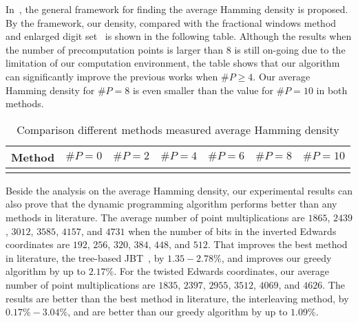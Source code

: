 In~\cite{analysisMethod}, the general framework for finding the average Hamming density is proposed. By the framework, our density, compared with the fractional windows method~\cite{fractional} and enlarged digit set~\cite{enlarged4} is shown in the following table. Although the results when the number of precomputation points is larger than $8$ is still on-going due to the limitation of our computation environment, the table shows that our algorithm can significantly improve the previous works when $\#P \geq 4$. Our average Hamming density for $\#P = 8$ is even smaller than the value for $\#P = 10$ in both methods.

\begin{table}[h]
\centering
\begin{tabular}{|L{0.2\textwidth}|*6{C{0.12\textwidth}|} }
\toprule
Method
	&$\#P = 0$
		&$\#P = 2$
			&$\#P = 4$
				&$\#P = 6$
					&$\#P = 8$
						&$\#P = 10$\\
\midrule

\bottomrule
{}
\end{tabular}
\caption{Comparison different methods measured average Hamming density}
\label{cmpied}
\end{table}

Beside the analysis on the average Hamming density, our experimental results can also prove that the dynamic programming algorithm performs better than any methods in literature. The average number of point multiplications are $1865$, $2439$, $3012$, $3585$, $4157$, and $4731$ when the number of bits in the inverted Edwards coordinates are $192$, $256$, $320$, $384$, $448$, and $512$. That improves the best method in literature, the tree-based JBT~\cite{DKS09}, by $1.35 - 2.78\%$, and improves our greedy algorithm by up to $2.17\%$. For the twisted Edwards coordinates, our average number of point multiplications are $1835$, $2397$, $2955$, $3512$, $4069$, and $4626$. The results are better than the best method in literature, the interleaving method, by $0.17\% - 3.04\%$, and are better than our greedy algorithm by up to $1.09\%$.
